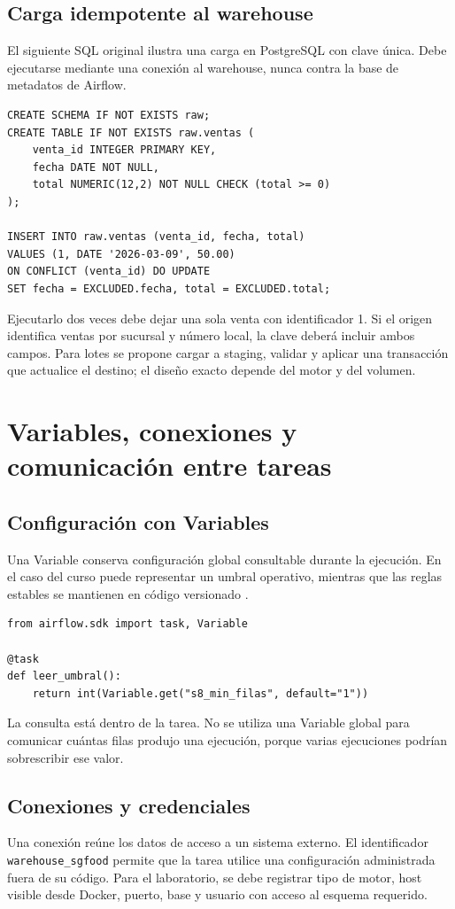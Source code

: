 \documentclass[12pt]{article}
\begin{document}
\subsection{Carga idempotente al warehouse}
El siguiente SQL original ilustra una carga en PostgreSQL con clave única. Debe ejecutarse mediante una conexión al warehouse, nunca contra la base de metadatos de Airflow.
\begin{lstlisting}[style=sql,caption={Repetición sin duplicar la venta del ejemplo}]
CREATE SCHEMA IF NOT EXISTS raw;
CREATE TABLE IF NOT EXISTS raw.ventas (
    venta_id INTEGER PRIMARY KEY,
    fecha DATE NOT NULL,
    total NUMERIC(12,2) NOT NULL CHECK (total >= 0)
);

INSERT INTO raw.ventas (venta_id, fecha, total)
VALUES (1, DATE '2026-03-09', 50.00)
ON CONFLICT (venta_id) DO UPDATE
SET fecha = EXCLUDED.fecha, total = EXCLUDED.total;
\end{lstlisting}
Ejecutarlo dos veces debe dejar una sola venta con identificador 1. Si el origen identifica ventas por sucursal y número local, la clave deberá incluir ambos campos. Para lotes se propone cargar a staging, validar y aplicar una transacción que actualice el destino; el diseño exacto depende del motor y del volumen.

\section{Variables, conexiones y comunicación entre tareas}
\subsection{Configuración con Variables}
Una Variable conserva configuración global consultable durante la ejecución. En el caso del curso puede representar un umbral operativo, mientras que las reglas estables se mantienen en código versionado \cite{airflow_variables}.
\begin{lstlisting}[style=python]
from airflow.sdk import task, Variable

@task
def leer_umbral():
    return int(Variable.get("s8_min_filas", default="1"))
\end{lstlisting}
La consulta está dentro de la tarea. No se utiliza una Variable global para comunicar cuántas filas produjo una ejecución, porque varias ejecuciones podrían sobrescribir ese valor.

\subsection{Conexiones y credenciales}
Una conexión reúne los datos de acceso a un sistema externo. El identificador \texttt{warehouse\_sgfood} permite que la tarea utilice una configuración administrada fuera de su código. Para el laboratorio, se debe registrar tipo de motor, host visible desde Docker, puerto, base y usuario con acceso al esquema requerido.
\end{document}
